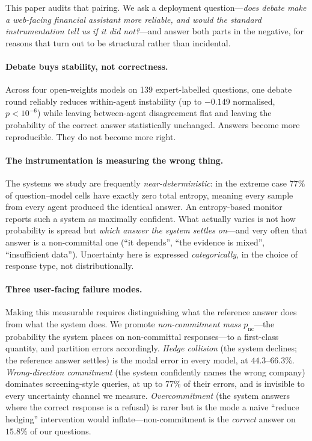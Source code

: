 \documentclass[sigconf,anonymous,review]{acmart}
\begin{document}
This paper audits that pairing. We ask a deployment question---\emph{does
debate make a web-facing financial assistant more reliable, and would the
standard instrumentation tell us if it did not?}---and answer both parts in
the negative, for reasons that turn out to be structural rather than
incidental.

\paragraph{Debate buys stability, not correctness.} Across four open-weights
models on 139 expert-labelled questions, one debate round reliably reduces
within-agent instability (up to $-0.149$ normalised, $p < 10^{-6}$) while
leaving between-agent disagreement flat and leaving the probability of the
correct answer statistically unchanged. Answers become more reproducible.
They do not become more right.

\paragraph{The instrumentation is measuring the wrong thing.} The systems we
study are frequently \emph{near-deterministic}: in the extreme case $77\%$ of
question--model cells have exactly zero total entropy, meaning every sample
from every agent produced the identical answer. An entropy-based monitor
reports such a system as maximally confident. What actually varies is not how
probability is spread but \emph{which answer the system settles on}---and
very often that answer is a non-committal one (``it depends'', ``the evidence
is mixed'', ``insufficient data''). Uncertainty here is expressed
\emph{categorically}, in the choice of response type, not distributionally.

\paragraph{Three user-facing failure modes.} Making this measurable requires
distinguishing what the reference answer does from what the system does. We
promote \emph{non-commitment mass} $p_{\mathrm{nc}}$---the probability the
system places on non-committal responses---to a first-class quantity, and
partition errors accordingly. \emph{Hedge collision} (the system declines;
the reference answer settles) is the modal error in every model, at
$44.3$--$66.3\%$. \emph{Wrong-direction commitment} (the system confidently
names the wrong company) dominates screening-style queries, at up to $77\%$
of their errors, and is invisible to every uncertainty channel we measure.
\emph{Overcommitment} (the system answers where the correct response is a
refusal) is rarer but is the mode a naive ``reduce hedging'' intervention
would inflate---non-commitment is the \emph{correct} answer on $15.8\%$ of
our questions.
\end{document}
